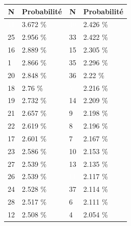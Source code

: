 \documentclass[letterpaper]{article}
\begin{document}
      \begin{table}[h]
	\centering
	\begin{tabular}{|l|l||l|l|}
	  \hline
	  \multicolumn{1}{|c|}{{\textbf{N}}} & %
	  \multicolumn{1}{c||}{\textbf{Probabilité}} & %
	  \multicolumn{1}{c|}{{\textbf{N}}} & %
	  \multicolumn{1}{c|}{\textbf{Probabilité}} \\ \hline
	  \cellcolor[HTML]{000000} \textcolor{white}{41} & 3.672 \%  & \cellcolor[HTML]{483D8B} \textcolor{white}{40} & 2.426 \% \\ \hline
	  \cellcolor[HTML]{FF4500} 25 & 2.956 \%  & \cellcolor[HTML]{2E8B57} 33 & 2.422 \% \\ \hline
	  \cellcolor[HTML]{E6E6FA} 16 & 2.889 \%  & \cellcolor[HTML]{FF69B4} 15 & 2.305 \% \\ \hline
	  \cellcolor[HTML]{FFFFFF}  1 & 2.866 \%  & \cellcolor[HTML]{2E8B57} 35 & 2.296 \% \\ \hline
	  \cellcolor[HTML]{FF8C00} 20 & 2.848 \%  & \cellcolor[HTML]{E6E6FA} 36 & 2.22 \%  \\ \hline
	  \cellcolor[HTML]{EEEED1} 18 & 2.76 \%   & \cellcolor[HTML]{8B1A1A}  \textcolor{white}{5} & 2.216 \% \\ \hline
	  \cellcolor[HTML]{FF8C00} 19 & 2.732 \%  & \cellcolor[HTML]{FF69B4} 14 & 2.209 \% \\ \hline
	  \cellcolor[HTML]{FFFFFF} 21 & 2.657 \%  & \cellcolor[HTML]{1E90FF}  9 & 2.198 \% \\ \hline
	  \cellcolor[HTML]{FF4500} 22 & 2.619 \%  & \cellcolor[HTML]{FFC1C1}  8 & 2.196 \% \\ \hline
	  \cellcolor[HTML]{FF8C00} 17 & 2.601 \%  & \cellcolor[HTML]{1E90FF}  7 & 2.167 \% \\ \hline
	  \cellcolor[HTML]{FFC1C1} 23 & 2.586 \%  & \cellcolor[HTML]{1E90FF} 10 & 2.153 \% \\ \hline
	  \cellcolor[HTML]{FFD700} 27 & 2.539 \%  & \cellcolor[HTML]{FFFFF0} 13 & 2.135 \% \\ \hline
	  \cellcolor[HTML]{E6E6FA} 26 & 2.539 \%  & \cellcolor[HTML]{000000} \textcolor{white}{11} & 2.117 \% \\ \hline
	  \cellcolor[HTML]{FF4500} 24 & 2.528 \%  & \cellcolor[HTML]{FFC1C1} 37 & 2.114 \% \\ \hline
	  \cellcolor[HTML]{FFD700} 28 & 2.517 \%  & \cellcolor[HTML]{E6E6FA}  6 & 2.111 \% \\ \hline
	  \cellcolor[HTML]{FF69B4} 12 & 2.508 \%  & \cellcolor[HTML]{A0522D}  4 & 2.054 \% \\ \hline

\end{tabular}
\end{table}
\end{document}
